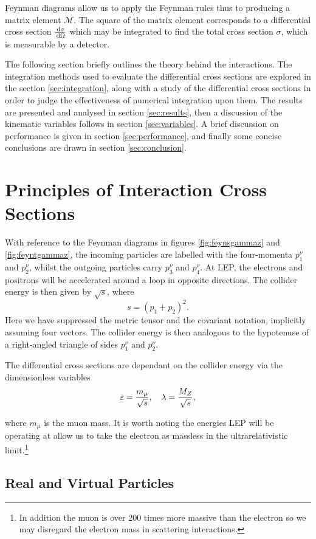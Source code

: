 \documentclass[]{article}
\begin{document}
Feynman diagrams allow us to apply the Feynman rules thus to producing a  matrix element $\mathcal{M}$. The square of the matrix element corresponds to a differential cross section $\frac{\,\operatorname{d}\!{\sigma}}{\,\operatorname{d}\!{\Omega}}$ which may be integrated to find the total cross section $\sigma$, which is measurable by a detector.

The following section briefly outlines the theory behind the interactions. The integration methods used to evaluate the differential cross sections are explored in the section \ref{sec:integration}, along with a study of the differential cross sections in order to judge the effectiveness of numerical integration upon them. The results are presented and analysed in section \ref{sec:results}, then a discussion of the kinematic variables follows in section \ref{sec:variables}. A brief discussion on performance is given in section \ref{sec:performance}, and finally some concise conclusions are drawn in section \ref{sec:conclusion}.

\section{Principles of Interaction Cross Sections}

With reference to the Feynman diagrams in figures \ref{fig:feynsgammaz} and \ref{fig:feyntgammaz}, the incoming particles are labelled with the four-momenta $p_{1}^{\nu}$ and $p_{2}^{\nu}$, whilst the outgoing particles carry $p_{3}^{\nu}$ and $p_{4}^{\nu}$. At LEP, the electrons and positrons will be accelerated around a loop in opposite directions. The collider energy is then given by $\sqrt{s}$, where $$s = (p_{1} + p_{2})^{2}.$$ Here we have suppressed the metric tensor and the covariant notation, implicitly assuming four vectors. The collider energy is then analogous to the hypotenuse of a right-angled triangle of sides $p_{1}^{\nu}$ and $p_{2}^{\nu}$.

The differential cross sections are dependant on the collider energy via the dimensionless variables $$\varepsilon = \frac{m_{\mu}}{\sqrt{s}}, \quad \lambda = \frac{M_{Z }}{\sqrt{s}},$$

where $m_{\mu}$ is the muon mass. It is worth noting the energies LEP will be operating at allow us to take the electron as massless in the ultrarelativistic limit.\footnote{In addition the muon is over 200 times more massive than the electron so we may disregard the electron mass in scattering interactions.}

\subsection{Real and Virtual Particles}
\end{document}
